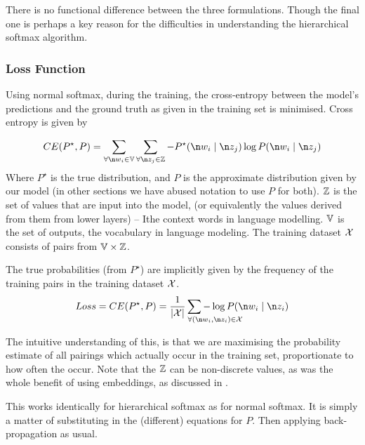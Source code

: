 {There is no functional difference between the three formulations.
Though the final one is perhaps a key reason for the difficulties in understanding the hierarchical softmax algorithm.

\subsubsection{Loss Function}\label{sec:softmax-loss-function}

Using normal softmax, during the training, the cross-entropy between the model's predictions and the ground truth as given in the training set is minimised.
Cross entropy is given by

\begin{equation}
CE(P^\star, P) = \sum_{\forall \n w_i\in \set{V}} \sum_{\forall \n z_j \in \set{Z}} -P^\star(\n w_i \mid \n z_j) \log P(\n w_i \mid \n z_j)
\end{equation}
Where $P^\star$ is the true distribution, and $P$ is the approximate distribution given by our model (in other sections we have abused notation to use $P$ for both).
$\mathbb{Z}$ is the set of values that are input into the model, (or equivalently the values derived from them from lower layers) -- Ithe context words in language modelling.
$\mathbb{V}$ is the set of outputs, the vocabulary in language modeling.
The training dataset $\mathcal{X}$ consists of pairs from $\mathbb{V} \times \mathbb{Z}$.

The true probabilities (from $P^\star$) are implicitly given by the frequency of the training pairs in the training dataset $\mathcal{X}$.
\begin{equation}
Loss=CE(P^\star, P) = \frac{1}{|\seq{X}|} \sum_{\mathrlap{\!\!\!\!\!\forall (\n w_i, \n z_i) \in \seq{X}}} -\log P(\n w_i \mid \n z_i)
\end{equation}


The intuitive understanding of this, is that we are maximising the probability estimate of all pairings which actually occur in the training set, proportionate to how often the occur.
Note that the $\mathbb{Z}$ can be non-discrete values, as was the whole benefit of using embeddings, as discussed in .

This works identically for hierarchical softmax as for normal softmax.
It is simply a matter of substituting in the (different) equations for $P$.
Then applying back-propagation as usual.

}
